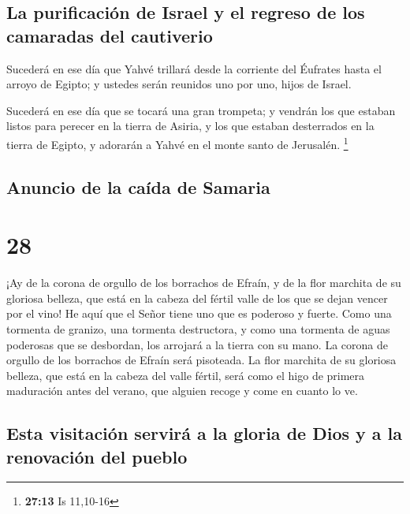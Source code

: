 \hypertarget{la-purificaciuxf3n-de-israel-y-el-regreso-de-los-camaradas-del-cautiverio}{%
\subsection{La purificación de Israel y el regreso de los camaradas del
cautiverio}\label{la-purificaciuxf3n-de-israel-y-el-regreso-de-los-camaradas-del-cautiverio}}

 Sucederá en ese día que Yahvé trillará desde la
corriente del Éufrates hasta el arroyo de Egipto; y ustedes serán
reunidos uno por uno, hijos de Israel.

 Sucederá en ese día que se tocará una gran trompeta; y
vendrán los que estaban listos para perecer en la tierra de Asiria, y
los que estaban desterrados en la tierra de Egipto, y adorarán a Yahvé
en el monte santo de Jerusalén. \footnote{\textbf{27:13} Is 11,10-16}

\hypertarget{anuncio-de-la-cauxedda-de-samaria}{%
\subsection{Anuncio de la caída de
Samaria}\label{anuncio-de-la-cauxedda-de-samaria}}

\hypertarget{section-27}{%
\section{28}\label{section-27}}

 ¡Ay de la corona de orgullo de los borrachos de Efraín, y
de la flor marchita de su gloriosa belleza, que está en la cabeza del
fértil valle de los que se dejan vencer por el vino!  He
aquí que el Señor tiene uno que es poderoso y fuerte. Como una tormenta
de granizo, una tormenta destructora, y como una tormenta de aguas
poderosas que se desbordan, los arrojará a la tierra con su mano.
 La corona de orgullo de los borrachos de Efraín será
pisoteada.  La flor marchita de su gloriosa belleza, que
está en la cabeza del valle fértil, será como el higo de primera
maduración antes del verano, que alguien recoge y come en cuanto lo ve.

\hypertarget{esta-visitaciuxf3n-serviruxe1-a-la-gloria-de-dios-y-a-la-renovaciuxf3n-del-pueblo}{%
\subsection{Esta visitación servirá a la gloria de Dios y a la
renovación del
pueblo}\label{esta-visitaciuxf3n-serviruxe1-a-la-gloria-de-dios-y-a-la-renovaciuxf3n-del-pueblo}}

